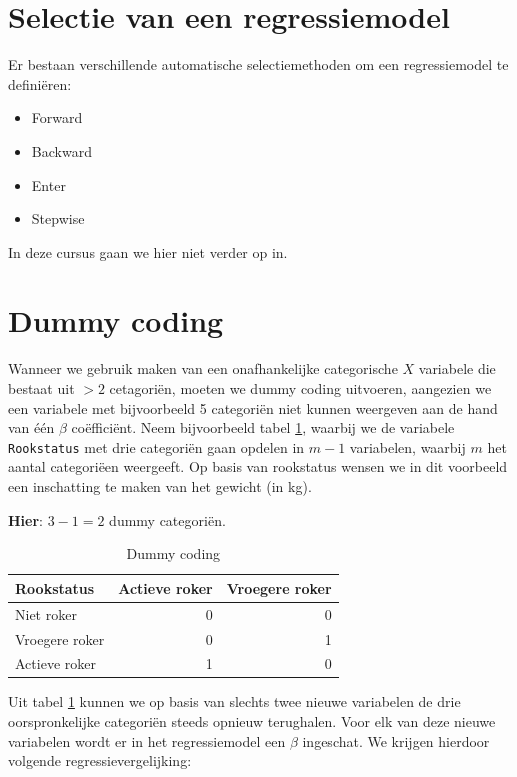 \documentclass[
]{book}
\providecommand{\tightlist}{%
  \setlength{\itemsep}{0pt}\setlength{\parskip}{0pt}}
\theoremstyle{definition}
\theoremstyle{definition}
\theoremstyle{definition}
\theoremstyle{definition}
\theoremstyle{remark}
\begin{document}
\hypertarget{selectie-van-een-regressiemodel}{%
\section*{Selectie van een regressiemodel}\label{selectie-van-een-regressiemodel}}


Er bestaan verschillende automatische selectiemethoden om een regressiemodel te definiëren:

\begin{itemize}
\tightlist
\item
  Forward
\item
  Backward
\item
  Enter
\item
  Stepwise
\end{itemize}

In deze cursus gaan we hier niet verder op in.

\hypertarget{dummy-coding}{%
\section*{Dummy coding}\label{dummy-coding}}


Wanneer we gebruik maken van een onafhankelijke categorische \(X\) variabele die bestaat uit \(>2\) cetagoriën, moeten we dummy coding uitvoeren, aangezien we een variabele met bijvoorbeeld 5 categoriën niet kunnen weergeven aan de hand van één \(\beta\) coëfficiënt. Neem bijvoorbeeld tabel \ref{tab:dummy1}, waarbij we de variabele \texttt{Rookstatus} met drie categoriën gaan opdelen in \(m-1\) variabelen, waarbij \(m\) het aantal categoriëen weergeeft. Op basis van rookstatus wensen we in dit voorbeeld een inschatting te maken van het gewicht (in kg).

\textbf{Hier}: \(3-1 = 2\) dummy categoriën.

\begin{table}

\caption{\label{tab:dummy1}Dummy coding}
\centering
\begin{tabular}[t]{lrr}
\toprule
Rookstatus & Actieve roker & Vroegere roker\\
\midrule
Niet roker & 0 & 0\\
Vroegere roker & 0 & 1\\
Actieve roker & 1 & 0\\
\bottomrule
\end{tabular}
\end{table}

Uit tabel \ref{tab:dummy1} kunnen we op basis van slechts twee nieuwe variabelen de drie oorspronkelijke categoriën steeds opnieuw terughalen. Voor elk van deze nieuwe variabelen wordt er in het regressiemodel een \(\beta\) ingeschat. We krijgen hierdoor volgende regressievergelijking:
\end{document}
